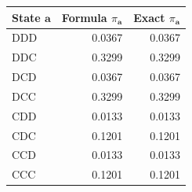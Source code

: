 \begin{tabular}{lrr}
\toprule
State $\mathbf{a}$ & Formula $\pi_{\mathbf{a}}$ & Exact $\pi_{\mathbf{a}}$ \\
\midrule
DDD & 0.0367 & 0.0367 \\
DDC & 0.3299 & 0.3299 \\
DCD & 0.0367 & 0.0367 \\
DCC & 0.3299 & 0.3299 \\
CDD & 0.0133 & 0.0133 \\
CDC & 0.1201 & 0.1201 \\
CCD & 0.0133 & 0.0133 \\
CCC & 0.1201 & 0.1201 \\
\bottomrule
\end{tabular}
